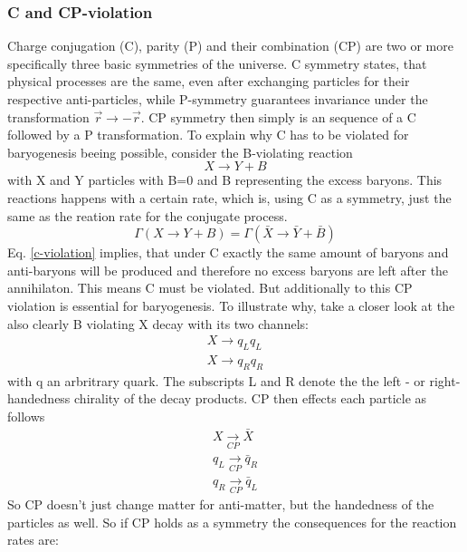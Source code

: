 \subsubsection{C and CP-violation}
Charge conjugation (C), parity (P) and their combination (CP) are two or more specifically three basic symmetries of the universe. C symmetry states, that physical processes are the same, even after exchanging particles for their respective anti-particles, while P-symmetry guarantees invariance under the transformation $\vec{r}\rightarrow-\vec{r}$. CP symmetry then simply is an sequence of a C followed by a P transformation. \newline
To explain why C has to be violated for baryogenesis beeing possible, consider the B-violating reaction
\begin{equation*}
	X\rightarrow Y+B
\end{equation*}
with X and Y particles with B=0 and B representing the excess baryons. This reactions happens with a certain rate, which is, using C as a symmetry, just the same as the reation rate for the conjugate process.
\begin{equation}
	\Gamma(X\rightarrow Y+B)=\Gamma(\bar{X}\rightarrow \bar{Y}+\bar{B})
	\label{c-violation}
\end{equation}
Eq. \ref{c-violation} implies, that under C exactly the same amount of baryons and anti-baryons will be produced and therefore no excess baryons are left after the annihilaton. This means C must be violated. \newline
But additionally to this CP violation is essential for baryogenesis. To illustrate why, take a closer look at the also clearly B  violating X decay with its two channels:
\begin{align*}
	X\rightarrow q_Lq_L\\
	X\rightarrow q_Rq_R
\end{align*}
with q an arbritrary quark. The subscripts L and R denote the the left - or right-handedness chirality of the decay products. CP then effects each particle as follows
\begin{align*}
	X\underset{CP}{\longrightarrow}\bar{X}\\
	q_{L}\underset{CP}{\longrightarrow}\bar{q}_{R}\\
	q_{R}\underset{CP}{\longrightarrow}\bar{q}_{L}
\end{align*}
So CP doesn't just change matter for anti-matter, but the handedness of the particles as well. So if CP holds as a symmetry the consequences for the reaction rates are:
